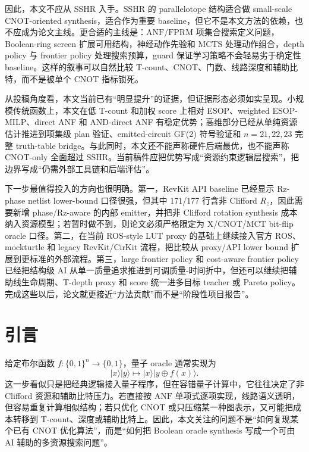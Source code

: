 \documentclass[UTF8,fontset=macnew,11pt]{ctexart}
\newcommand{\anf}{\ensuremath{\mathrm{ANF}}}
\newcommand{\fprm}{\ensuremath{\mathrm{FPRM}}}
\newcommand{\mcts}{\ensuremath{\mathrm{MCTS}}}
\newcommand{\xor}{\ensuremath{\oplus}}
\newcommand{\ttable}{truth-table}
\begin{document}
因此，本文不应从 SSHR 入手。SSHR 的 parallelotope 结构适合做 small-scale CNOT-oriented synthesis，适合作为重要 baseline，但它不是本文方法的依赖，也不应成为论文主线。更合适的主线是：\anf{}/\fprm{} 项集合搜索定义问题，Boolean-ring screen 扩展可用结构，神经动作先验和 \mcts{} 处理动作组合，depth policy 与 frontier policy 处理搜索预算，guard 保证学习策略不会轻易劣于确定性 baseline。这样的叙事可以自然比较 T-count、CNOT、门数、线路深度和辅助比特，而不是被单个 CNOT 指标锁死。

从投稿角度看，本文当前已有“明显提升”的证据，但证据形态必须如实呈现。小规模传统函数上，本文在低 T-count 和加权 score 上相对 ESOP、weighted ESOP-MILP、direct ANF 和 AND-direct ANF 有稳定优势；高维部分已经从单纯资源估计推进到项集级 plan 验证、emitted-circuit GF(2) 符号验证和 $n=21,22,23$ 完整 \ttable{} bridge。与此同时，本文还不能声称硬件后端最优，也不能声称 CNOT-only 全面超过 SSHR。当前稿件应把优势写成“资源约束逻辑层搜索”，把边界写成“仍需外部工具链和后端评估”。

下一步最值得投入的方向也很明确。第一，RevKit API baseline 已经显示 Rz-phase netlist lower-bound 口径很强，但其中 171/177 行含非 Clifford $R_z$，因此需要新增 phase/Rz-aware 的内部 emitter，并把非 Clifford rotation synthesis 成本纳入资源模型；若暂时做不到，则论文必须严格限定为 X/CNOT/MCT bit-flip oracle 口径。第二，在当前 ROS-style LUT proxy 的基础上继续接入官方 ROS、mockturtle 和 legacy RevKit/CirKit 流程，把比较从 proxy/API lower bound 扩展到更标准的外部流程。第三，large frontier policy 和 cost-aware frontier policy 已经把结构级 AI 从单一质量追求推进到可调质量-时间折中，但还可以继续把辅助线生命周期、T-depth proxy 和 score 统一进多目标 teacher 或 Pareto policy。完成这些以后，论文就更接近“方法贡献”而不是“阶段性项目报告”。

\section{引言}

给定布尔函数 $f:\{0,1\}^n\rightarrow\{0,1\}$，量子 oracle 通常实现为
\begin{equation}
  |x\rangle |y\rangle \mapsto |x\rangle |y\xor f(x)\rangle .
  \label{eq:oracle}
\end{equation}
这一步看似只是把经典逻辑接入量子程序，但在容错量子计算中，它往往决定了非 Clifford 资源和辅助比特压力。若直接按 \anf{} 单项式逐项实现，线路语义透明，但容易重复计算相似结构；若只优化 CNOT 或只压缩某一种图表示，又可能把成本转移到 T-count、深度或辅助比特上。因此，本文关注的问题不是“如何复现某个已有 CNOT 优化算法”，而是“如何把 Boolean oracle synthesis 写成一个可由 AI 辅助的多资源搜索问题”。
\end{document}
